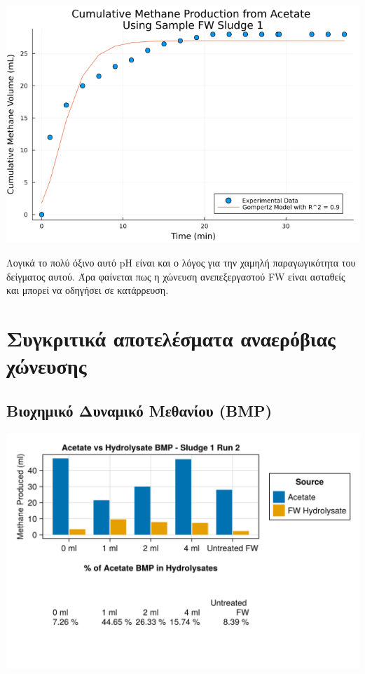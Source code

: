 \documentclass[11pt]{article}
\begin{document}
\begin{center}
\includegraphics[width=.9\linewidth]{../plots/BMPs/Acetate/methane_kinetics_acet_test_fw_s1_min.png}
\end{center}

Λογικά το πολύ όξινο αυτό pH είναι και ο λόγος για την χαμηλή παραγωγικότητα του δείγματος αυτού. Άρα φαίνεται πως η χώνευση ανεπεξεργαστού FW είναι ασταθείς και μπορεί να οδηγήσει σε κατάρρευση.

\section{Συγκριτικά αποτελέσματα αναερόβιας χώνευσης}
\label{sec:org2605ba7}
\subsection{Βιοχημικό Δυναμικό Μεθανίου (BMP)}
\label{sec:orgd4b96ef}
\begin{center}
\includegraphics[width=.9\linewidth]{../plots/BMPs/Hydrolyzed FW/acet_vs_hydro_bmp_s1_r2.png}
\end{center}
\end{document}

